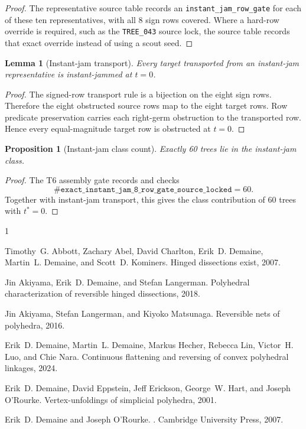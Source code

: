 \documentclass[11pt,a4paper]{article}
\newtheorem{proposition}[theorem]{Proposition}
\newtheorem{lemma}[theorem]{Lemma}
\theoremstyle{definition}
\theoremstyle{remark}
\begin{document}
\begin{proof}
The representative source table records an \texttt{instant\_jam\_row\_gate} for each of these ten representatives, with all 8 sign rows covered.  Where a hard-row override is required, such as the \texttt{TREE\_043} source lock, the source table records that exact override instead of using a scout seed.
\end{proof}

\begin{lemma}[Instant-jam transport]
Every target transported from an instant-jam representative is instant-jammed at \(t=0\).
\end{lemma}

\begin{proof}
The signed-row transport rule is a bijection on the eight sign rows.  Therefore the eight obstructed source rows map to the eight target rows.  Row predicate preservation carries each right-germ obstruction to the transported row.  Hence every equal-magnitude target row is obstructed at \(t=0\).
\end{proof}

\begin{proposition}[Instant-jam class count]
Exactly 60 trees lie in the instant-jam class.
\end{proposition}

\begin{proof}
The T6 assembly gate records and checks
\[
  \#\texttt{exact\_instant\_jam\_8\_row\_gate\_source\_locked}=60.
\]
Together with instant-jam transport, this gives the class contribution of 60 trees with \(t^*=0\).
\end{proof}


\begin{thebibliography}{1}

Timothy~G. Abbott, Zachary Abel, David Charlton, Erik~D. Demaine, Martin~L.
  Demaine, and Scott~D. Kominers.
\newblock Hinged dissections exist, 2007.

Jin Akiyama, Erik~D. Demaine, and Stefan Langerman.
\newblock Polyhedral characterization of reversible hinged dissections, 2018.

Jin Akiyama, Stefan Langerman, and Kiyoko Matsunaga.
\newblock Reversible nets of polyhedra, 2016.

Erik~D. Demaine, Martin~L. Demaine, Markus Hecher, Rebecca Lin, Victor~H. Luo,
  and Chie Nara.
\newblock Continuous flattening and reversing of convex polyhedral linkages,
  2024.

Erik~D. Demaine, David Eppstein, Jeff Erickson, George~W. Hart, and Joseph
  O'Rourke.
\newblock Vertex-unfoldings of simplicial polyhedra, 2001.

Erik~D. Demaine and Joseph O'Rourke.
.
\newblock Cambridge University Press, 2007.

\end{thebibliography}
\end{document}
